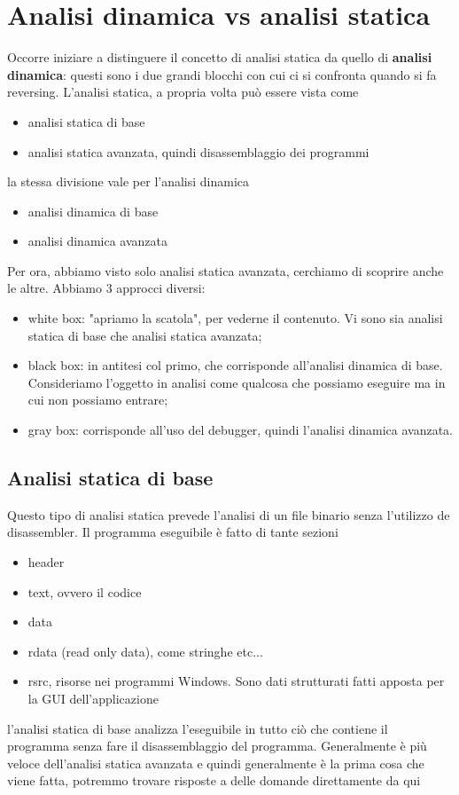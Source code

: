 \documentclass[12pt, oneside]{extbook}
\begin{document}
\section{Analisi dinamica vs analisi statica}
Occorre iniziare a distinguere il concetto di analisi statica da quello di \textbf{analisi dinamica}: questi sono i due grandi blocchi con cui ci si confronta quando si fa reversing. L'analisi statica, a propria volta può essere vista come
\begin{itemize}
\item analisi statica di base
\item analisi statica avanzata, quindi disassemblaggio dei programmi
\end{itemize}
la stessa divisione vale per l'analisi dinamica
\begin{itemize}
\item analisi dinamica di base
\item analisi dinamica avanzata
\end{itemize}
Per ora, abbiamo visto solo analisi statica avanzata, cerchiamo di scoprire anche le altre. Abbiamo 3 approcci diversi:
\begin{itemize}
\item white box: "apriamo la scatola", per vederne il contenuto. Vi sono sia analisi statica di base che analisi statica avanzata;
\item black box: in antitesi col primo, che corrisponde all'analisi dinamica di base. Consideriamo l'oggetto in analisi come qualcosa che possiamo eseguire ma in cui non possiamo entrare;
\item gray box: corrisponde all'uso del debugger, quindi l'analisi dinamica avanzata.
\end{itemize}
\subsection{Analisi statica di base}
Questo tipo di analisi statica prevede l'analisi di un file binario senza l'utilizzo de disassembler. Il programma eseguibile è fatto di tante sezioni
\begin{itemize}
\item header
\item text, ovvero il codice
\item data
\item rdata (read only data), come stringhe etc...
\item rsrc, risorse nei programmi Windows. Sono dati strutturati fatti apposta per la GUI dell'applicazione
\end{itemize}
l'analisi statica di base analizza l'eseguibile in tutto ciò che contiene il programma senza fare il disassemblaggio del programma. Generalmente è più veloce dell'analisi statica avanzata e quindi generalmente è la prima cosa che viene fatta, potremmo trovare risposte a delle domande direttamente da qui
\end{document}
